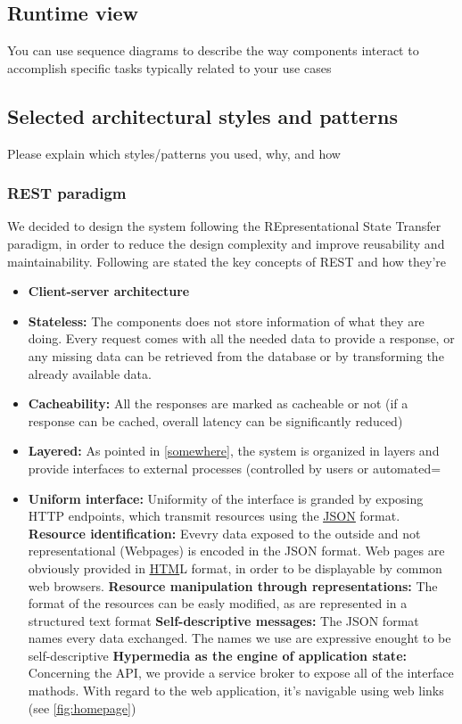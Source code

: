 \documentclass{article}
\newcommand{\link}[2]{{\color{blue}\underline{\href{#1}{#2}}}}
\begin{document}
	\subsection{Runtime view}	You	can	use	sequence	diagrams	to	describe	the	way	components	interact	
to	accomplish	specific	tasks	typically	related	to	your	use	cases
	\subsection{Selected architectural styles and patterns} Please	explain	which	styles/patterns	you	used,	
why,	and	how
		\subsubsection{REST paradigm}
			We decided to design the system following the REpresentational State Transfer paradigm, 				in order to reduce the design complexity and improve reusability and maintainability.
			Following are stated the key concepts of REST and how they're 
			\begin{itemize}
				\item \textbf{Client-server architecture}
				\item \textbf{Stateless:} 
					The components does not store information of what they are doing. Every request comes with all the needed data to
					provide a response, or any missing data can be retrieved from the database or by transforming the already available
					data.
				\item \textbf{Cacheability:} 
					All the responses are marked as cacheable or not (if a response can be cached, overall 
					latency can be significantly reduced)
				\item \textbf{Layered:} 
					As pointed in \ref{somewhere}, the system is organized in layers and provide
					interfaces to external processes (controlled by users or automated=
				\item \textbf{Uniform interface:} 
					Uniformity of the interface is granded by exposing HTTP endpoints, which transmit resources using
					the \link{https://json.org/json-en.html}{JSON} format.
					\subitem \textbf{Resource identification:} 
						Evevry data exposed to the outside and not representational (Webpages) is 
						encoded in the JSON format. Web pages are obviously provided in 
						\link{https://en.wikipedia.org/wiki/HTML}{HTM}L format, in order to be displayable by
						common web browsers.
					\subitem \textbf{Resource manipulation through representations:}
						The format of the resources can be easly modified, as are represented
						in a structured text format
					\subitem \textbf{Self-descriptive messages:}
						The JSON format names every data exchanged. The names we use are
						expressive enought to be self-descriptive
					\subitem \textbf{Hypermedia as the engine of application state:}
						Concerning the API, we provide a service broker to expose all of the
						interface mathods. With regard to the web application, it's navigable 
						using web links (see \ref{fig:homepage})
			\end{itemize}
\end{document}
